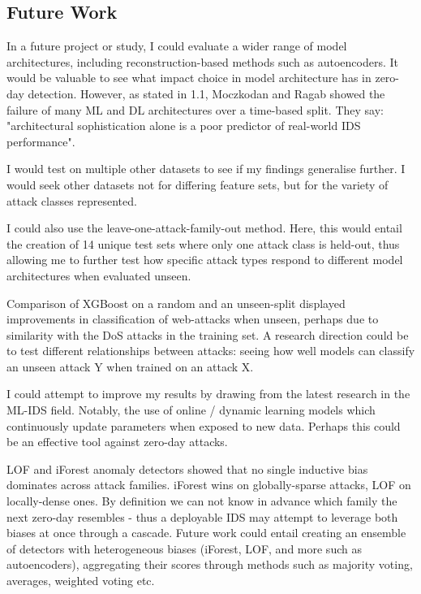 \documentclass{article}
\begin{document}
\subsection{Future Work}
In a future project or study, I could evaluate a wider range of model architectures, including reconstruction-based methods such as autoencoders. It would be valuable to see what impact choice in model architecture has in zero-day detection. However, as stated in 1.1, Moczkodan and Ragab showed the failure of many ML and DL architectures over a time-based split. They say: "architectural sophistication alone is a poor predictor of real-world IDS performance"\parencite{moczkodan2026}.
\par I would test on multiple other datasets to see if my findings generalise further. I would seek other datasets not for differing feature sets, but for the variety of attack classes represented. 
\par I could also use the leave-one-attack-family-out method. Here, this would entail the creation of 14 unique test sets where only one attack class is held-out, thus allowing me to further test how specific attack types respond to different model architectures when evaluated unseen. 
\par Comparison of XGBoost on a random and an unseen-split displayed improvements in classification of web-attacks when unseen, perhaps due to similarity with the DoS attacks in the training set. A research direction could be to test different relationships between attacks: seeing how well models can classify an unseen attack Y when trained on an attack X.
\par I could attempt to improve my results by drawing from the latest research in the ML-IDS field. Notably, the use of online / dynamic learning models which continuously update parameters when exposed to new data. Perhaps this could be an effective tool against zero-day attacks.
\par LOF and iForest anomaly detectors showed that no single inductive bias dominates across attack families. iForest wins on globally-sparse attacks, LOF on locally-dense ones. By definition we can not know in advance which family the next zero-day resembles - thus a deployable IDS may attempt to leverage both biases at once through a cascade. Future work could entail creating an ensemble of detectors with heterogeneous biases (iForest, LOF, and more such as autoencoders), aggregating their scores through methods such as majority voting, averages, weighted voting etc.
\end{document}
